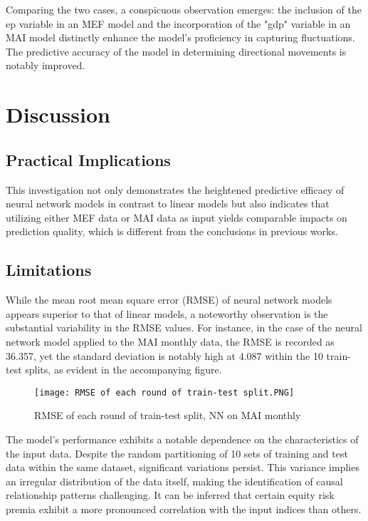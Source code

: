 \documentclass{article}
\begin{document}
\noindent Comparing the two cases, a conspicuous observation emerges: the inclusion of the ep variable in an MEF model and the incorporation of the "gdp" variable in an MAI model distinctly enhance the model's proficiency in capturing fluctuations. The predictive accuracy of the model in determining directional movements is notably improved.

\newpage

\section{Discussion}

\subsection{Practical Implications}

This investigation not only demonstrates the heightened predictive efficacy of neural network models in contrast to linear models but also indicates that utilizing either MEF data or MAI data as input yields comparable impacts on prediction quality, which is different from the conclusions in previous works.

\subsection{Limitations}

While the mean root mean square error (RMSE) of neural network models appears superior to that of linear models, a noteworthy observation is the substantial variability in the RMSE values. For instance, in the case of the neural network model applied to the MAI monthly data, the RMSE is recorded as 36.357, yet the standard deviation is notably high at 4.087 within the 10 train-test splits, as evident in the accompanying figure.
\begin{figure}[H]
    \centering \texttt{[image: RMSE of each round of train-test split.PNG]}
    \caption{RMSE of each round of train-test split, NN on MAI monthly}
\end{figure}
\noindent The model's performance exhibits a notable dependence on the characteristics of the input data. Despite the random partitioning of 10 sets of training and test data within the same dataset, significant variations persist. This variance implies an irregular distribution of the data itself, making the identification of causal relationship patterns challenging. It can be inferred that certain equity risk premia exhibit a more pronounced correlation with the input indices than others.
\end{document}
